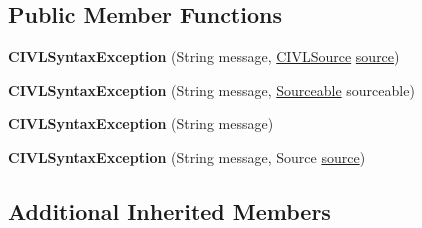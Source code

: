 \subsection*{Public Member Functions}
\begin{DoxyCompactItemize}
\item 
\hypertarget{classedu_1_1udel_1_1cis_1_1vsl_1_1civl_1_1model_1_1IF_1_1CIVLSyntaxException_a587596652f9e44d0a111635c0f43ead5}{}{\bfseries C\+I\+V\+L\+Syntax\+Exception} (String message, \hyperlink{interfaceedu_1_1udel_1_1cis_1_1vsl_1_1civl_1_1model_1_1IF_1_1CIVLSource}{C\+I\+V\+L\+Source} \hyperlink{classedu_1_1udel_1_1cis_1_1vsl_1_1civl_1_1model_1_1IF_1_1CIVLException_a29eba9d3541bcd7e2306404c6ece4d98}{source})\label{classedu_1_1udel_1_1cis_1_1vsl_1_1civl_1_1model_1_1IF_1_1CIVLSyntaxException_a587596652f9e44d0a111635c0f43ead5}

\item 
\hypertarget{classedu_1_1udel_1_1cis_1_1vsl_1_1civl_1_1model_1_1IF_1_1CIVLSyntaxException_a4df3b7c68f22f982a36be7734edec0d3}{}{\bfseries C\+I\+V\+L\+Syntax\+Exception} (String message, \hyperlink{interfaceedu_1_1udel_1_1cis_1_1vsl_1_1civl_1_1model_1_1IF_1_1Sourceable}{Sourceable} sourceable)\label{classedu_1_1udel_1_1cis_1_1vsl_1_1civl_1_1model_1_1IF_1_1CIVLSyntaxException_a4df3b7c68f22f982a36be7734edec0d3}

\item 
\hypertarget{classedu_1_1udel_1_1cis_1_1vsl_1_1civl_1_1model_1_1IF_1_1CIVLSyntaxException_a5fdd9ac3c096aa99223eef363dff3862}{}{\bfseries C\+I\+V\+L\+Syntax\+Exception} (String message)\label{classedu_1_1udel_1_1cis_1_1vsl_1_1civl_1_1model_1_1IF_1_1CIVLSyntaxException_a5fdd9ac3c096aa99223eef363dff3862}

\item 
\hypertarget{classedu_1_1udel_1_1cis_1_1vsl_1_1civl_1_1model_1_1IF_1_1CIVLSyntaxException_a4961146f36d4a89777e639e87e810d26}{}{\bfseries C\+I\+V\+L\+Syntax\+Exception} (String message, Source \hyperlink{classedu_1_1udel_1_1cis_1_1vsl_1_1civl_1_1model_1_1IF_1_1CIVLException_a29eba9d3541bcd7e2306404c6ece4d98}{source})\label{classedu_1_1udel_1_1cis_1_1vsl_1_1civl_1_1model_1_1IF_1_1CIVLSyntaxException_a4961146f36d4a89777e639e87e810d26}

\end{DoxyCompactItemize}
\subsection*{Additional Inherited Members}


